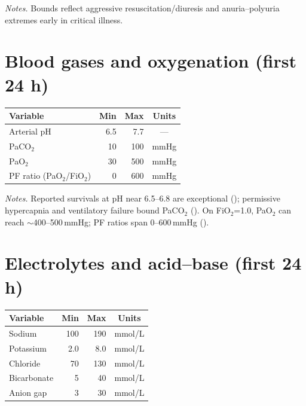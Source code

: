\noindent\textit{Notes.} Bounds reflect aggressive resuscitation/diuresis and anuria–polyuria extremes early in critical illness.

\vspace{0.75\baselineskip}
\section*{Blood gases and oxygenation (first 24 h)}
\vspace{0.75\baselineskip}
\begin{table}[ht!]\centering\small
\begin{tabular}{lrrc}
\toprule
\textbf{Variable} & \textbf{Min} & \textbf{Max} & \textbf{Units} \\
\midrule
Arterial pH & 6.5 & 7.7 & --- \\
PaCO$_2$ & 10 & 100 & mmHg \\
PaO$_2$ & 30 & 500 & mmHg \\
PF ratio (PaO$_2$/FiO$_2$) & 0 & 600 & mmHg \\
\bottomrule
\end{tabular}
\end{table}

\noindent\textit{Notes.} Reported survivals at pH near 6.5–6.8 are exceptional (\citealt{pH6point68}); permissive hypercapnia and ventilatory failure bound PaCO$_2$ (\citealt{PermissiveHypercapnia,MedscapeRespAcidosis}). On FiO$_2$=1.0, PaO$_2$ can reach $\sim$400–500\,mmHg; PF ratios span 0–600\,mmHg (\citealt{TargetPO2,FPNotebookO2Sat}).

\vspace{0.75\baselineskip}
\section*{Electrolytes and acid–base (first 24 h)}
\vspace{0.75\baselineskip}
\begin{table}[ht!]\centering\small
\begin{tabular}{lrrc}
\toprule
\textbf{Variable} & \textbf{Min} & \textbf{Max} & \textbf{Units} \\
\midrule
Sodium & 100 & 190 & mmol/L \\
Potassium & 2.0 & 8.0 & mmol/L \\
Chloride & 70 & 130 & mmol/L \\
Bicarbonate & 5 & 40 & mmol/L \\
Anion gap & 3 & 30 & mmol/L \\
\bottomrule
\end{tabular}
\end{table}

